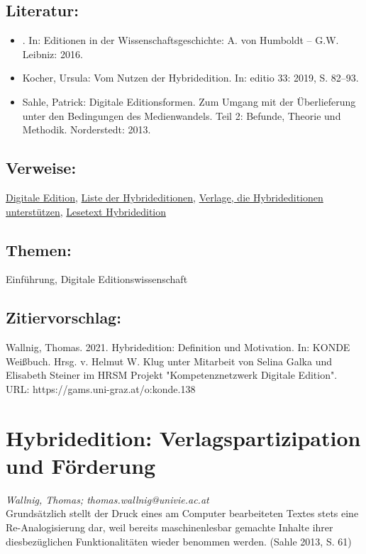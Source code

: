 \documentclass{article}
\begin{document}
        \subsection*{Literatur:}\begin{itemize}\item . In: Editionen in der Wissenschaftsgeschichte: A. von Humboldt – G.W. Leibniz: 2016.\item Kocher, Ursula: Vom Nutzen der Hybridedition. In: editio 33: 2019, S. 82–93.\item Sahle, Patrick: Digitale Editionsformen. Zum Umgang mit der Überlieferung unter den Bedingungen des Medienwandels. Teil 2: Befunde, Theorie und Methodik. Norderstedt: 2013.\end{itemize}\subsection*{Verweise:}\href{https://gams.uni-graz.at/o:konde.59}{Digitale Edition}, \href{https://gams.uni-graz.at/o:konde.117}{Liste der Hybrideditionen}, \href{https://gams.uni-graz.at/o:konde.208}{Verlage, die Hybrideditionen unterstützen}, \href{https://gams.uni-graz.at/o:konde.22}{Lesetext Hybridedition}\subsection*{Themen:}Einführung, Digitale Editionswissenschaft\subsection*{Zitiervorschlag:}Wallnig, Thomas. 2021. Hybridedition: Definition und Motivation. In: KONDE Weißbuch. Hrsg. v. Helmut W. Klug unter Mitarbeit von Selina Galka und Elisabeth Steiner im HRSM Projekt "Kompetenznetzwerk Digitale Edition". URL: https://gams.uni-graz.at/o:konde.138\newpage\section*{Hybridedition: Verlagspartizipation und Förderung} \emph{Wallnig, Thomas; thomas.wallnig@univie.ac.at }\\
        
    Grundsätzlich stellt der Druck eines am Computer bearbeiteten Textes stets eine Re-Analogisierung dar, weil bereits maschinenlesbar gemachte Inhalte ihrer diesbezüglichen Funktionalitäten wieder benommen werden. (Sahle 2013, S. 61)\\
            
\end{document}
